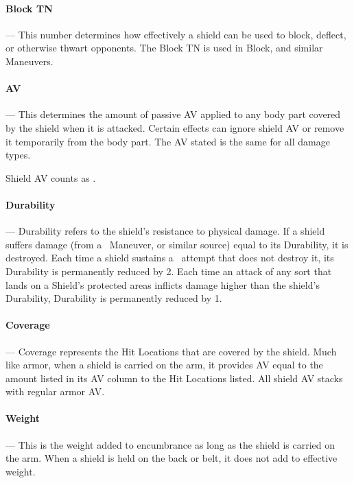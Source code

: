 \documentclass[oneside,11pt,english]{book}
\begin{document}
\vspace{-10pt}\paragraph{Block TN}---\quad
This number determines how effectively a shield can be used to block, deflect, or otherwise thwart 
opponents. The Block TN is used in Block, and similar Maneuvers. 

\vspace{-10pt}\paragraph{AV}---\quad
This determines the amount of passive AV applied to any body part covered by the
shield when it is attacked. Certain effects can ignore shield AV or remove it
temporarily from the body part. The AV stated is the same for all damage types. 

Shield AV counts as .

\vspace{-10pt}\paragraph{Durability}---\quad
Durability refers to the shield’s resistance to physical damage. If a shield
suffers damage (from a ~Maneuver, or similar source) equal to
its Durability, it is destroyed. Each time a shield sustains a
~attempt that does not destroy it, its Durability is
permanently reduced by 2. Each time an attack of any sort that lands on a
Shield’s protected areas inflicts damage higher than the shield's Durability,
Durability is permanently reduced by 1. 

\vspace{-10pt}\paragraph{Coverage} ---\quad
Coverage represents the Hit Locations that are covered by the shield. Much like armor, when a shield is 
carried on the arm, it provides AV equal to the amount listed in its AV column to the Hit Locations listed. 
All shield AV stacks with regular armor AV. 

\vspace{-10pt}\paragraph{Weight}---\quad
This is the weight added to encumbrance as long as the shield is carried on the arm. When a shield is held 
on the back or belt, it does not add to effective weight. 
\end{document}
